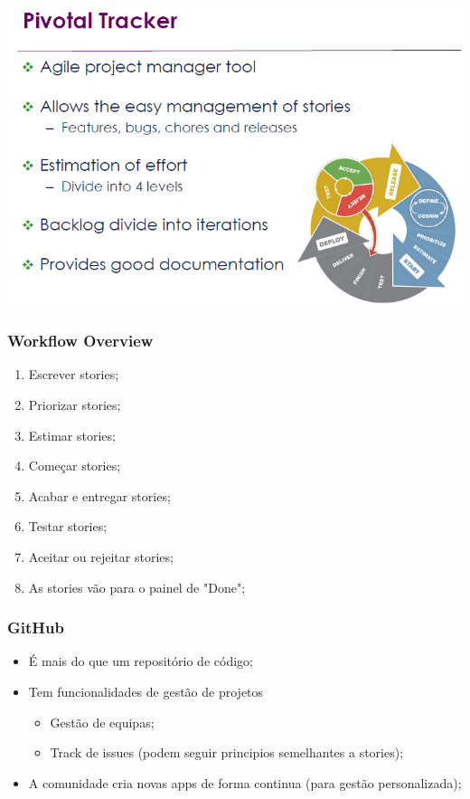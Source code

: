 \documentclass{article}
\begin{document}
\pagebreak

\begin{center}
  \includegraphics[scale=0.6]{47}
\end{center}

\subsubsection*{Workflow Overview}

\begin{enumerate}
  \item Escrever stories;
  \item Priorizar stories;
  \item Estimar stories;
  \item Começar stories;
  \item Acabar e entregar stories;
  \item Testar stories;
  \item Aceitar ou rejeitar stories;
  \item As stories vão para o painel de "Done";
\end{enumerate}

\subsubsection*{GitHub}

\begin{itemize}
  \item É mais do que um repositório de código;
  \item Tem funcionalidades de gestão de projetos
  \begin{itemize}
    \item Gestão de equipas;
    \item Track de issues (podem seguir principios semelhantes a stories);
  \end{itemize}
  \item A comunidade cria novas apps de forma continua (para gestão personalizada);
\end{itemize}
\end{document}
